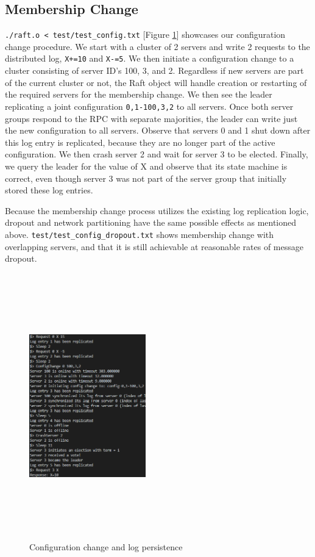 \documentclass[letterpaper,twocolumn,10pt]{article}
\begin{document}
\subsection{Membership Change}
\texttt{./raft.o < test/test\_config.txt} [Figure \ref{fig:config_change}] showcases our configuration change procedure. We start with a cluster of 2 servers and write 2 requests to the distributed log, \texttt{X+=10} and \texttt{X-=5}. We then initiate a configuration change to a cluster consisting of server ID's 100, 3, and 2. Regardless if new servers are part of the current cluster or not, the Raft object will handle creation or restarting of the required servers for the membership change. We then see the leader replicating a joint configuration \texttt{0,1-100,3,2} to all servers. Once both server groups respond to the RPC with separate majorities, the leader can write just the new configuration to all servers. Observe that servers 0 and 1 shut down after this log entry is replicated, because they are no longer part of the active configuration. We then crash server 2 and wait for server 3 to be elected. Finally, we query the leader for the value of X and observe that its state machine is correct, even though server 3 was not part of the server group that initially stored these log entries.

Because the membership change process utilizes the existing log replication logic, dropout and network partitioning have the same possible effects as mentioned above. \texttt{test/test\_config\_dropout.txt} shows membership change with overlapping servers, and that it is still achievable at reasonable rates of message dropout.

\begin{figure}[htb!]
\centering
\includegraphics[width=0.45\textwidth,height=115mm]{images/config_change.png}
\caption{Configuration change and log persistence}
\label{fig:config_change}
\end{figure}
\end{document}

